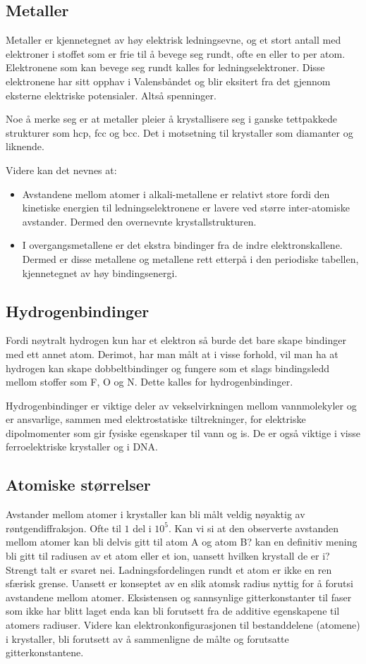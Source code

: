 \documentclass{article}
\begin{document}
\subsection{Metaller}
Metaller er kjennetegnet av høy elektrisk ledningsevne, og et stort antall med elektroner i stoffet som er frie til å bevege seg rundt, ofte  en eller to per atom. Elektronene som kan bevege seg rundt kalles for ledningselektroner. Disse elektronene har sitt opphav i Valensbåndet og blir eksitert fra det gjennom eksterne elektriske potensialer. Altså spenninger. 

Noe å merke seg er at metaller pleier å krystallisere seg i ganske tettpakkede strukturer som hcp, fcc og bcc. Det i motsetning til krystaller som diamanter og liknende.

Videre kan det nevnes at:
\begin{itemize}
    \item Avstandene mellom atomer i alkali-metallene er relativt store fordi den kinetiske energien til ledningselektronene er lavere ved større inter-atomiske avstander. Dermed den overnevnte krystallstrukturen.
    \item I overgangsmetallene er det ekstra bindinger fra de indre elektronskallene. Dermed er disse metallene og metallene rett etterpå i den periodiske tabellen, kjennetegnet av høy bindingsenergi.
\end{itemize}
\subsection{Hydrogenbindinger}
Fordi nøytralt hydrogen kun har et elektron så burde det bare skape bindinger med ett annet atom. Derimot, har man målt at i visse forhold, vil man ha at hydrogen kan skape dobbeltbindinger og fungere som et slags bindingsledd mellom stoffer som F, O og N. Dette kalles for hydrogenbindinger.

Hydrogenbindinger er viktige deler av vekselvirkningen mellom vannmolekyler og er ansvarlige, sammen med elektrostatiske tiltrekninger, for elektriske dipolmomenter som gir fysiske egenskaper til vann og is. De er også viktige i visse ferroelektriske krystaller og i DNA.
\subsection{Atomiske størrelser}
Avstander mellom atomer i krystaller kan bli målt veldig nøyaktig av røntgendiffraksjon. Ofte til $1$ del i $10^5$. Kan vi si at den observerte avstanden mellom atomer kan bli delvis gitt til atom A og atom B? kan en definitiv mening bli gitt til radiusen av et atom eller et ion, uansett hvilken krystall de er i? Strengt talt er svaret nei. Ladningsfordelingen rundt et atom er ikke en ren sfærisk grense. Uansett er konseptet av en slik atomsk radius nyttig for å forutsi avstandene mellom atomer. Eksistensen og sannsynlige gitterkonstanter til faser som ikke har blitt laget enda kan bli forutsett fra de additive egenskapene til atomers radiuser. Videre kan elektronkonfigurasjonen til bestanddelene (atomene) i krystaller, bli forutsett av å sammenligne de målte og forutsatte gitterkonstantene.
\end{document}
